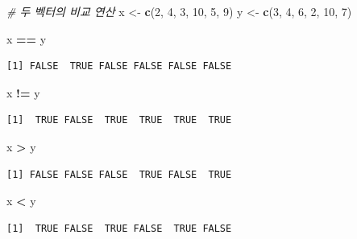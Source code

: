 \documentclass[
  11pt,
]{krantz}
\newenvironment{Shaded}{\begin{snugshade}}{\end{snugshade}}
\newcommand{\CommentTok}[1]{\textcolor[rgb]{0.37,0.37,0.37}{\textit{#1}}}
\newcommand{\DecValTok}[1]{\textcolor[rgb]{0.06,0.06,0.06}{#1}}
\newcommand{\KeywordTok}[1]{\textcolor[rgb]{0.27,0.27,0.27}{\textbf{#1}}}
\newcommand{\NormalTok}[1]{#1}
\newcommand{\OperatorTok}[1]{\textcolor[rgb]{0.43,0.43,0.43}{\textbf{#1}}}
\newcommand{\StringTok}[1]{\textcolor[rgb]{0.5,0.5,0.5}{#1}}
\begin{document}
\footnotesize

\begin{Shaded}
\begin{Highlighting}[]
\CommentTok{# 두 벡터의 비교 연산}
\NormalTok{x <-}\StringTok{ }\KeywordTok{c}\NormalTok{(}\DecValTok{2}\NormalTok{, }\DecValTok{4}\NormalTok{, }\DecValTok{3}\NormalTok{, }\DecValTok{10}\NormalTok{, }\DecValTok{5}\NormalTok{, }\DecValTok{9}\NormalTok{)}
\NormalTok{y <-}\StringTok{ }\KeywordTok{c}\NormalTok{(}\DecValTok{3}\NormalTok{, }\DecValTok{4}\NormalTok{, }\DecValTok{6}\NormalTok{, }\DecValTok{2}\NormalTok{, }\DecValTok{10}\NormalTok{, }\DecValTok{7}\NormalTok{)}

\NormalTok{x }\OperatorTok{==}\StringTok{ }\NormalTok{y}
\end{Highlighting}
\end{Shaded}

\begin{verbatim}
[1] FALSE  TRUE FALSE FALSE FALSE FALSE
\end{verbatim}

\begin{Shaded}
\begin{Highlighting}[]
\NormalTok{x }\OperatorTok{!=}\StringTok{ }\NormalTok{y}
\end{Highlighting}
\end{Shaded}

\begin{verbatim}
[1]  TRUE FALSE  TRUE  TRUE  TRUE  TRUE
\end{verbatim}

\begin{Shaded}
\begin{Highlighting}[]
\NormalTok{x }\OperatorTok{>}\StringTok{ }\NormalTok{y}
\end{Highlighting}
\end{Shaded}

\begin{verbatim}
[1] FALSE FALSE FALSE  TRUE FALSE  TRUE
\end{verbatim}

\begin{Shaded}
\begin{Highlighting}[]
\NormalTok{x }\OperatorTok{<}\StringTok{ }\NormalTok{y}
\end{Highlighting}
\end{Shaded}

\begin{verbatim}
[1]  TRUE FALSE  TRUE FALSE  TRUE FALSE
\end{verbatim}
\end{document}

